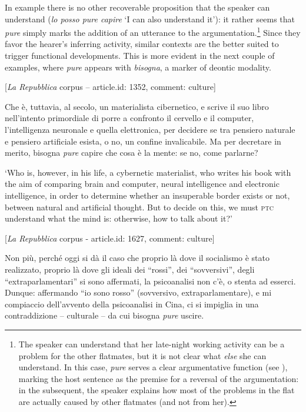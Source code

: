 In example  there is no other recoverable proposition that the speaker can understand (\textit{lo posso pure capire} ‘I can also understand it’): it rather seems that \textit{pure} simply marks the addition of an utterance to the argumentation.\footnote{The speaker can understand that her late-night working activity can be a problem for the other flatmates, but it is not clear what \textit{else} she can understand. In this case, \textit{pure} serves a clear argumentative function (see \citealt{AnscombreDucrot1983}), marking the host sentence as the premise for a reversal of the argumentation: in the subsequent, the speaker explains how most of the problems in the flat are actually caused by other flatmates (and not from her).} Since they favor the hearer’s inferring activity, similar contexts are the better suited to trigger functional developments. This is more evident in the next couple of examples, where \textit{pure} appears with \textit{bisogna}, a marker of deontic modality.

\ea%
    \label{ex:key:46}

           [\textit{La Repubblica} corpus – article.id: 1352, comment: culture]

Che è, tuttavia, al secolo, un materialista cibernetico, e scrive il suo libro nell’intento primordiale di porre a confronto il cervello e il computer, l’intelligenza neuronale e quella elettronica, per decidere se tra pensiero naturale e pensiero artificiale esista, o no, un confine invalicabile. Ma per decretare in merito, bisogna \textit{pure} capire che cosa è la mente: se no, come parlarne?

\glt ‘Who is, however, in his life, a cybernetic materialist, who writes his book with the aim of comparing brain and computer, neural intelligence and electronic intelligence, in order to determine whether an insuperable border exists or not, between natural and artificial thought. But to decide on this, we must \textsc{ptc} understand what the mind is: otherwise, how to talk about it?’
    \z

\ea%
    \label{ex:key:47}

          [\textit{La Repubblica} corpus - article.id: 1627, comment: culture]

Non più, perché oggi si dà il caso che proprio là dove il socialismo è stato realizzato, proprio là dove gli ideali dei “rossi”, dei “sovversivi”, degli “extraparlamentari” si sono affermati, la psicoanalisi non c’è, o stenta ad esserci. Dunque: affermando “io sono rosso” (sovversivo, extraparlamentare), e mi compiaccio dell’avvento della psicoanalisi in Cina, ci si impiglia in una contraddizione – culturale – da cui bisogna \textit{pure} uscire.

